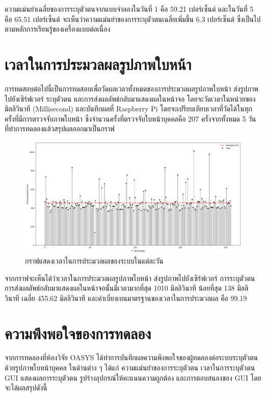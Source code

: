 \newpage
\indent ความแม่นยำเฉลี่ยของการระบุตัวตนจากแบบจำลองในวันที่ 1 คือ 59.21 เปอร์เซ็นต์ และในวันที่ 5 คือ 65.51 เปอร์เซ็นต์ จะเห็นว่าความแม่นยำของการระบุตัวตนเฉลี่ยเพิ่มขึ้น 6.3 เปอร์เซ็นต์ 
ซึ่งเป็นไปตามหลักการเรียนรู้ของเครื่องแบบต่อเนื่อง



\section{เวลาในการประมวลผลรูปภาพใบหน้า}
การทดสอบต่อไปนี้เป็นการทดสอบเพื่อวัดผลเวลาทั้งหมดของการประมวลผลรูปภาพใบหน้า ส่งรูปภาพไปยังเซิร์ฟเวอร์ ระบุตัวตน และการส่งผลลัพธ์กลับมาแสดงผลในหน้าจอ
โดยจะวัดเวลาในหน่วยของมิลลิวินาที (Millisecond) และบันทึกผลที่ Raspberry Pi โดยจะเปรียบเทียบเวลาที่วัดได้ในทุกครั้งที่มีการตรวจจับภาพใบหน้า 
ซึ่งจำนวนครั้งที่ตรวจจับใบหน้าบุคคลคือ 207 ครั้งจากทั้งหมด 5 วันที่ทำการทดลองแล้วสรุปผลออกมาเป็นกราฟ
  
\begin{figure}[!ht]
  \begin{center}
    \includegraphics[scale=.4]{pic/Time_1.png}
    \caption[กราฟแสดงเวลาในการประมวลผลของระบบในแต่ละวัน]{กราฟแสดงเวลาในการประมวลผลของระบบในแต่ละวัน}
    \label{fig:time_graph}
  \end{center}
\end{figure}
\newpage
\indent จากกราฟจะเห็นได้ว่าเวลาในการประมวลผลรูปภาพใบหน้า ส่งรูปภาพไปยังเซิร์ฟเวอร์ การระบุตัวตน การส่งผลลัพธ์กลับมาแสดงผลในหน้าจอนั้นมีเวลามากที่สุด 1010 มิลลิวินาที 
น้อยที่สุด 138 มิลลิวินาที เฉลี่ย 455.62 มิลลิวินาที และค่าเบี่ยงเบนมาตรฐานของเวลาในการประมวลผล คือ 99.19



\section{ความพึงพอใจของการทดลอง}
จากการทดลองที่ห้องวิจัย OASYS ได้ทำการบันทึกผลความพึงพอใจของผู้ทดลองต่อระบบระบุตัวตนด้วยรูปภาพใบหน้าบุคคล ในด้านต่าง ๆ ได้แก่ 
ความแม่นยำของการระบุตัวตน เวลาในการระบุตัวตน GUI แสดงผลการระบุตัวตน รูปร่างอุปกรณ์ให้คะแนนความถูกต้อง และการตอบสนองของ GUI โดยจะได้ผลสรุปดังนี้

